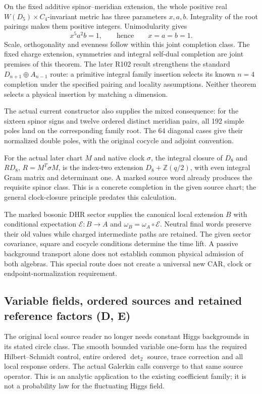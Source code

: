 On the fixed additive spinor--meridian extension, the whole positive
real $W(D_5)\times C_4$-invariant metric has three parameters $x,a,b$.
Integrality of the root pairings makes them positive integers.
Unimodularity gives
\[
                 x^5a^2b=1,
 \qquad\text{hence}\qquad x=a=b=1.
\]
Scale, orthogonality and evenness follow within this joint completion
class. The fixed charge extension, symmetries and integral self-dual
completion are joint premises of this theorem. The later R102 result
strengthens the standard $D_{n+1}\oplus A_{n-1}$ route: a primitive
integral family insertion selects its known $n=4$ completion under the
specified pairing and locality assumptions. Neither theorem selects a
physical insertion by matching a dimension.

The actual current constructor also supplies the mixed consequence:
for the sixteen spinor signs and twelve ordered distinct meridian
pairs, all 192 simple poles land on the corresponding family root.
The 64 diagonal cases give their normalized double poles, with the
original cocycle and adjoint convention.

For the actual later chart $M$ and native clock $\sigma$, the integral
closure of $D_8$ and $R D_8$, $R=M^T\sigma M$, is the index-two
extension $D_8+\mathbb Z(q/2)$, with even integral Gram matrix and
determinant one. A marked source word already produces the requisite
spinor class. This is a concrete completion in the given source chart;
the general clock-closure principle predates this calculation.

The marked bosonic DHR sector supplies the canonical local extension
$B$ with conditional expectation $\mathcal E:B\to A$ and
$\omega_B=\omega_A\circ\mathcal E$. Neutral final words preserve their
old values while charged intermediate paths are retained. The given
sector covariance, square and cocycle conditions determine the time
lift. A passive background transport alone does not establish common
physical admission of both algebras. This special route does not create
a universal new CAR, clock or endpoint-normalization requirement.

\subsection*{Variable fields, ordered sources and retained reference factors (D, E)}

The original local source reader no longer needs constant Higgs
backgrounds in its stated circle class. The smooth bounded variable
one-form has the required Hilbert--Schmidt control, entire ordered
$\det_2$ source, trace correction and all local response orders.
The actual Galerkin calls converge to that same source operator.
This is an analytic application to the existing coefficient family;
it is not a probability law for the fluctuating Higgs field.

